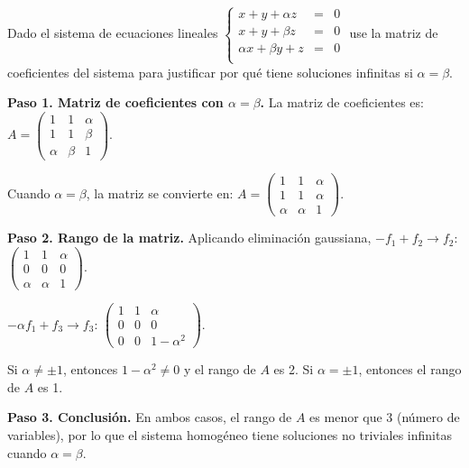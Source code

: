 \begin{prob}
Dado el sistema de ecuaciones lineales $\left\lbrace \begin{array}{ccc }
x + y + \alpha z&=&0\\
x + y + \beta z&=&0\\
\alpha x + \beta y + z&=&0\\
\end{array} \right.$ use la matriz de coeficientes del sistema para justificar por qué tiene soluciones infinitas si $\alpha=\beta.$



\begin{myproof}
\textbf{Paso 1. Matriz de coeficientes con $\alpha=\beta$.} La matriz de coeficientes es: $A = \left( \begin{array}{ccc}
1 & 1 & \alpha \\
1 & 1 & \beta \\
\alpha & \beta & 1
\end{array} \right).$

Cuando $\alpha = \beta$, la matriz se convierte en: $A = \left( \begin{array}{ccc}
1 & 1 & \alpha \\
1 & 1 & \alpha \\
\alpha & \alpha & 1
\end{array} \right).$

\textbf{Paso 2. Rango de la matriz.} Aplicando eliminación gaussiana, $-f_1 + f_2 \to f_2$: $\left( \begin{array}{ccc}
1 & 1 & \alpha \\
0 & 0 & 0 \\
\alpha & \alpha & 1
\end{array} \right).$

$-\alpha f_1 + f_3 \to f_3$: $\left( \begin{array}{ccc}
1 & 1 & \alpha \\
0 & 0 & 0 \\
0 & 0 & 1-\alpha^2
\end{array} \right).$

Si $\alpha \neq \pm 1$, entonces $1-\alpha^2 \neq 0$ y el rango de $A$ es 2.
Si $\alpha = \pm 1$, entonces el rango de $A$ es 1.

\textbf{Paso 3. Conclusión.} En ambos casos, el rango de $A$ es menor que 3 (número de variables), por lo que el sistema homogéneo tiene soluciones no triviales infinitas cuando $\alpha = \beta$.
\end{myproof}
\end{prob}

